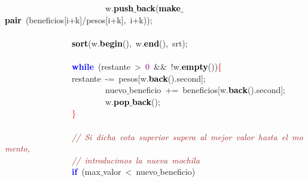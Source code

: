 \mbox{}\ \ \ \ \ \ \ \ \ \ \ \ \ \ \ \ \ \ \ \ \ \ \ \ w\textcolor{BrickRed}{.}\textbf{\textcolor{Black}{push$\_$back}}\textcolor{BrickRed}{(}\textbf{\textcolor{Black}{make$\_$pair}}\ \textcolor{BrickRed}{(}beneficios\textcolor{BrickRed}{[}i\textcolor{BrickRed}{+}k\textcolor{BrickRed}{]/}pesos\textcolor{BrickRed}{[}i\textcolor{BrickRed}{+}k\textcolor{BrickRed}{],}\ i\textcolor{BrickRed}{+}k\textcolor{BrickRed}{));} \\
\mbox{} \\
\mbox{}\ \ \ \ \ \ \ \ \ \ \ \ \ \ \ \ \textbf{\textcolor{Black}{sort}}\textcolor{BrickRed}{(}w\textcolor{BrickRed}{.}\textbf{\textcolor{Black}{begin}}\textcolor{BrickRed}{(),}\ w\textcolor{BrickRed}{.}\textbf{\textcolor{Black}{end}}\textcolor{BrickRed}{(),}\ srt\textcolor{BrickRed}{);} \\
\mbox{} \\
\mbox{}\ \ \ \ \ \ \ \ \ \ \ \ \ \ \ \ \textbf{\textcolor{Blue}{while}}\ \textcolor{BrickRed}{(}restante\ \textcolor{BrickRed}{\textgreater{}}\ \textcolor{Purple}{0}\ \textcolor{BrickRed}{\&\&}\ \textcolor{BrickRed}{!}w\textcolor{BrickRed}{.}\textbf{\textcolor{Black}{empty}}\textcolor{BrickRed}{())}\textcolor{Red}{\{} \\
\mbox{}\ \ \ \ \ \ \ \ \ \ \ \ \ \ \ \ restante\ \textcolor{BrickRed}{-=}\ pesos\textcolor{BrickRed}{[}w\textcolor{BrickRed}{.}\textbf{\textcolor{Black}{back}}\textcolor{BrickRed}{().}second\textcolor{BrickRed}{];} \\
\mbox{}\ \ \ \ \ \ \ \ \ \ \ \ \ \ \ \ \ \ \ \ \ \ \ \ nuevo$\_$beneficio\ \textcolor{BrickRed}{+=}\ beneficios\textcolor{BrickRed}{[}w\textcolor{BrickRed}{.}\textbf{\textcolor{Black}{back}}\textcolor{BrickRed}{().}second\textcolor{BrickRed}{];} \\
\mbox{}\ \ \ \ \ \ \ \ \ \ \ \ \ \ \ \ \ \ \ \ \ \ \ \ w\textcolor{BrickRed}{.}\textbf{\textcolor{Black}{pop$\_$back}}\textcolor{BrickRed}{();} \\
\mbox{}\ \ \ \ \ \ \ \ \ \ \ \ \ \ \ \ \textcolor{Red}{\}} \\
\mbox{} \\
\mbox{}\ \ \ \ \ \ \ \ \ \ \ \ \ \ \ \ \textit{\textcolor{Brown}{//\ Si\ dicha\ cota\ superior\ supera\ al\ mejor\ valor\ hasta\ el\ momento,}} \\
\mbox{}\ \ \ \ \ \ \ \ \ \ \ \ \ \ \ \ \textit{\textcolor{Brown}{//\ introducimos\ la\ nueva\ mochila}} \\
\mbox{}\ \ \ \ \ \ \ \ \ \ \ \ \ \ \ \ \textbf{\textcolor{Blue}{if}}\ \textcolor{BrickRed}{(}max$\_$valor\ \textcolor{BrickRed}{\textless{}}\ nuevo$\_$beneficio\textcolor{BrickRed}{)} \\
